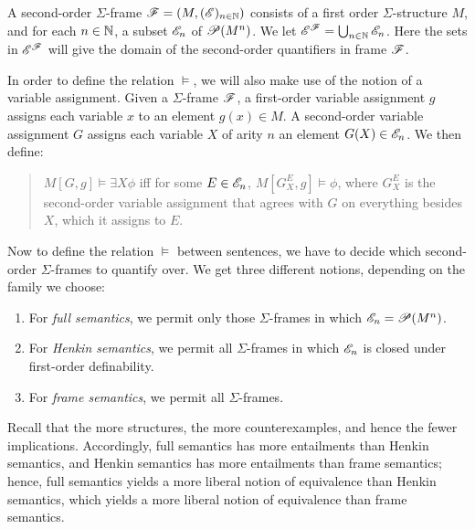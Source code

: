 \begin{defn} A second-order $\Sigma$-frame $\mathscr F=(M,(\mathscr E )_{n\in\mathbb N })$
  consists of a first order $\Sigma$-structure $M$, and for each
  $n\in \mathbb N$, a subset $\mathscr E _n$ of $\mathscr P(M^n)$.  We let
  $\mathscr E ^{\mathscr F}=\bigcup _{n\in\mathbb N}\mathscr E _n$.  Here the sets in
  $\mathscr E ^{\mathscr F}$ will give the domain of the second-order quantifiers in
  frame $\mathscr F$. \end{defn}

In order to define the relation $\vDash$, we will also make use of the
notion of a variable assignment.  Given a $\Sigma$-frame $\mathscr F$, a
first-order variable assignment $g$ assigns each variable $x$ to an
element $g(x)\in M$.  A second-order variable assignment $G$ assigns
each variable $X$ of arity $n$ an element $G(X)\in \mathscr E _n$.  We then
define:
\begin{quote} $M[G,g] \vDash \exists X\phi$ iff for some $E\in \mathscr E_n$,
  $M[G^E_X,g]\vDash \phi$, where $G^E_X$ is the second-order variable
  assignment that agrees with $G$ on everything besides $X$, which it
  assigns to $E$.  \end{quote} Now to define the relation $\vDash$
between sentences, we have to decide which second-order
$\Sigma$-frames to quantify over.  We get three different notions,
depending on the family we choose:
\begin{enumerate}
\item For \emph{full semantics}, we permit only those $\Sigma$-frames
  in which $\mathscr E _n=\mathscr P(M^n)$.
\item For \emph{Henkin semantics}, we permit all $\Sigma$-frames in
  which $\mathscr E _n$ is closed under first-order definability.
\item For \emph{frame semantics}, we permit all $\Sigma$-frames.
  \end{enumerate}
  Recall that the more structures, the more counterexamples, and hence
  the fewer implications.  Accordingly, full semantics has more
  entailments than Henkin semantics, and Henkin semantics has more
  entailments than frame semantics; hence, full semantics yields a
  more liberal notion of equivalence than Henkin semantics, which
  yields a more liberal notion of equivalence than frame semantics.

